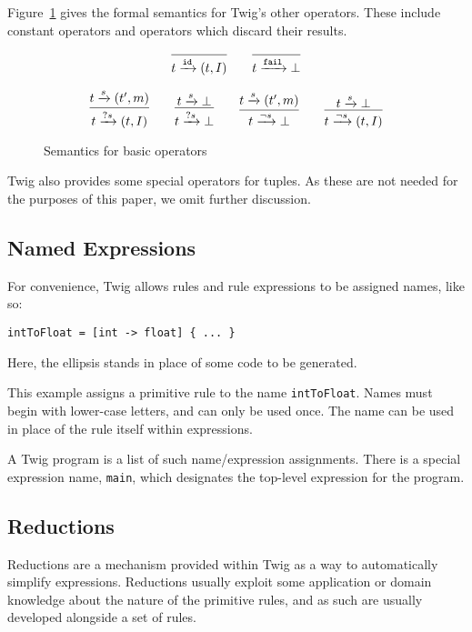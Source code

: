 Figure~\ref{semantics:basic} gives the formal semantics for Twig's other operators. These include constant operators and operators which discard their results.

\begin{figure}[ht]
\label{semantics:basic}
\[
\infer{t \arr{\mathtt{id}} (t,I)}{}
\qquad
\infer{t \arr{\mathtt{fail}} \bot}{}
\]

\[
\infer{t \arr{?s} (t,I)}{t \arr{s} (t',m)}
\qquad 
\infer{t \arr{?s} \bot}{t \arr{s} \bot}
\qquad
\infer{t \arr{\lnot s} \bot}{t \arr{s} (t',m)}
\qquad 
\infer{t \arr{\lnot s} (t,I)}{t \arr{s} \bot}
\]
\caption{Semantics for basic operators}
\end{figure}

Twig also provides some special operators for tuples. As these are not needed for the purposes of this paper, we omit further discussion.

\subsection{Named Expressions}
\label{section:names}

For convenience, Twig allows rules and rule expressions to be assigned names, like so:

\begin{verbatim}
intToFloat = [int -> float] { ... }
\end{verbatim}

Here, the ellipsis stands in place of some code to be generated.

This example assigns a primitive rule to the name \texttt{intToFloat}. Names must begin with lower-case letters, and can only be used once. The name can be used in place of the rule itself within expressions.

A Twig program is a list of such name/expression assignments. There is a special expression name, \texttt{main}, which designates the top-level expression for the program.

\subsection{Reductions}
\label{sec:reductions}

Reductions are a mechanism provided within Twig as a way to automatically simplify expressions. Reductions usually exploit some application or domain knowledge about the nature of the primitive rules, and as such are usually developed alongside a set of rules.

